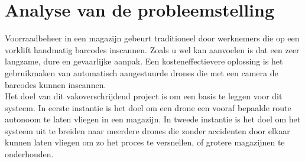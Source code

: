 \chapter{Analyse van de probleemstelling}
Voorraadbeheer in een magazijn gebeurt traditioneel door werknemers die op een vorklift handmatig barcodes inscannen. Zoals u wel kan aanvoelen is dat een zeer langzame, dure en gevaarlijke aanpak. Een kosteneffectievere oplossing is het gebruikmaken van automatisch aangestuurde drones die met een camera de barcodes kunnen inscannen.\\

Het doel van dit vakoverschrijdend project is om een basis te leggen voor dit systeem. In eerste instantie is het doel om een drone een vooraf bepaalde route autonoom te laten vliegen in een magazijn. In tweede instantie is het doel om het systeem uit te breiden naar meerdere drones die zonder accidenten door elkaar kunnen laten vliegen om zo het proces te versnellen, of grotere magazijnen te onderhouden.